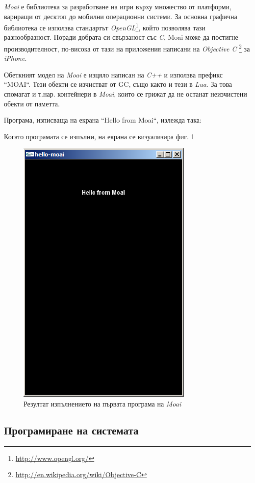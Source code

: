 			\emph{Moai} е библиотека за разработване на игри върху множество от платформи, вариращи от десктоп до
			мобилни операционни системи. За основна графична библиотека се използва стандартът 
			\emph{OpenGL}\footnote{\url{http://www.opengl.org/}}, който позволява тази разнообразност.
			Поради добрата си свързаност със \emph{C}, Moai може да постигне производителност, по-висока
			от тази на приложения написани на  \emph{Objective C}
			\footnote{\url{http://en.wikipedia.org/wiki/Objective-C}} за \emph{iPhone}.

			Обеткният модел на \emph{Moai} е изцяло написан на \emph{C++} и използва префикс ``MOAI``. Тези обекти
			се изчистват от \ac{GC}, също както и тези в \emph{Lua}. За това спомагат и т.нар. контейнери в \emph{Moai},
			които се грижат да не останат неизчистени обекти от паметта.
			
			\newpage			
			
			Програма, изписваща на екрана ``Hello from Moai``, излежда така:
			
						
			
			Когато програмата се изпълни, на екрана се визуализира фиг. \ref{figure:hello-moai}
			
			\begin{figure} 
				\caption{Резултат изпълнението на първата програма на \emph{Moai}}
				\label{figure:hello-moai}
					\begin{center}
						\includegraphics{assets/images/hello-moai.png}				
					\end{center}
			\end{figure}
			
			\newpage

			
	\subsection{Програмиране на системата}